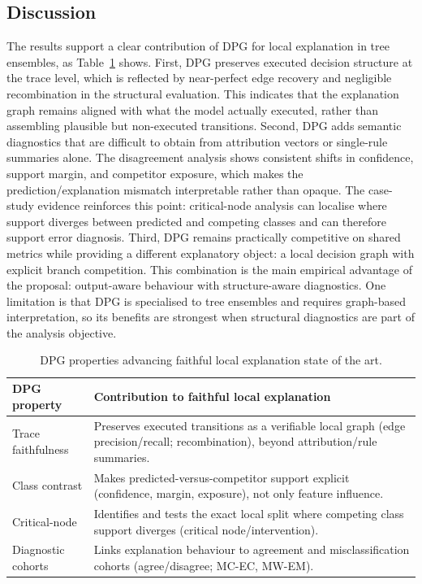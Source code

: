 \documentclass[runningheads]{llncs}
\begin{document}
\subsection{Discussion} \label{sec:discussion}
The results support a clear contribution of DPG for local explanation in tree ensembles, as Table~\ref{tab:dpg-metrics-properties} shows. First, DPG preserves executed decision structure at the trace level, which is reflected by near-perfect edge recovery and negligible recombination in the structural evaluation. This indicates that the explanation graph remains aligned with what the model actually executed, rather than assembling plausible but non-executed transitions.
Second, DPG adds semantic diagnostics that are difficult to obtain from attribution vectors or single-rule summaries alone. The disagreement analysis shows consistent shifts in confidence, support margin, and competitor exposure, which makes the prediction/explanation mismatch interpretable rather than opaque.
The case-study evidence reinforces this point: critical-node analysis can localise where support diverges between predicted and competing classes and can therefore support error diagnosis.
Third, DPG remains practically competitive on shared metrics while providing a different explanatory object: a local decision graph with explicit branch competition. This combination is the main empirical advantage of the proposal: output-aware behaviour with structure-aware diagnostics.
One limitation is that DPG is specialised to tree ensembles and requires graph-based interpretation, so its benefits are strongest when structural diagnostics are part of the analysis objective.

\begin{table}[ht!]
\centering
\small
\caption{DPG properties advancing faithful local explanation state of the art.}
\label{tab:dpg-metrics-properties}
\begin{tabular}{p{3.3cm} p{8.5cm}}
\toprule
DPG property & Contribution to faithful local explanation \\
\midrule
Trace faithfulness & Preserves executed transitions as a verifiable local graph (edge precision/recall; recombination), beyond attribution/rule summaries. \\
Class contrast & Makes predicted-versus-competitor support explicit (confidence, margin, exposure), not only feature influence. \\
Critical-node & Identifies and tests the exact local split where competing class support diverges (critical node/intervention). \\
Diagnostic cohorts & Links explanation behaviour to agreement and misclassification cohorts (agree/disagree; MC-EC, MW-EM). \\
\bottomrule
\end{tabular}
\end{table}
\end{document}
